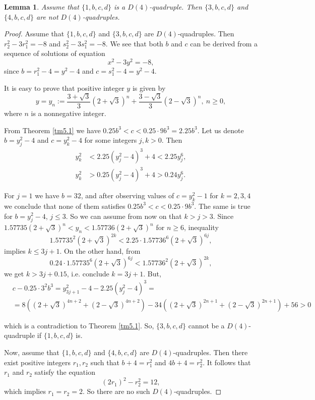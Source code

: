 \documentclass[12pt]{amsart}%
\newtheorem{lemma}[theorem]{Lemma}
\theoremstyle{definition}
\theoremstyle{remark}
\theoremstyle{plain}
\begin{document}
\begin{lemma}\label{lem:a1je1}
    Assume that $\{1,b,c,d\}$ is a $D(4)$-quadruple. Then $\{3,b,c,d\}$ and $\{4,b,c,d\}$ are not $D(4)$-quadruples.  
\end{lemma}
\begin{proof}
    Assume that $\{1,b,c,d\}$ and $\{3,b,c,d\}$ are $D(4)$-quadruples. Then $r_2^2-3r_1^2=-8$ and $s_2^2-3s_1^2=-8.$ We see that both $b$ and $c$ can be derived from a sequence of solutions of equation \begin{equation}\label{eq:pellova_r_13}
    x^2-3y^2=-8,
    \end{equation}
    since $b=r_1^2-4=y^2-4$ and $c=s_1^2-4=y^2-4$. 

    It is easy to prove that positive integer $y$ is given by
    $$
    y=y_n:=\frac{3+\sqrt{3}}{3}(2+\sqrt{3})^n+\frac{3-\sqrt{3}}{3}(2-\sqrt{3})^n,\ n\geq 0,
    $$
   where  $n$ is a nonnegative integer.

    From Theorem \ref{tm5.1} we have $0.25b^3<c<0.25\cdot 9b^3=2.25b^3$. Let us denote $b=y_j^2-4$ and $c=y_k^2-4$ for some integers $j,k>0$. Then 
    \begin{align*}
        y_k^2&<2.25(y_j^2-4)^3+4<2.25y_j^6,\\
        y_k^2&>0.25(y_j^2-4)^3+4>0.24y_j^6.
    \end{align*}

    For $j=1$ we have $b=32$, and after observing values of $c=y_k^2-1$ for $k=2,3,4$ we conclude that none of them satisfies $0.25b^3<c<0.25\cdot 9b^3$.  
     The same is true for $b=y_j^2-4$, $j\leq 3$. So we can assume from now on that $k>j>3$.  
    Since $1.57735(2+\sqrt{3})^n<y_n<1.57736(2+\sqrt{3})^n$ for $n\geq 6$, inequality
    $$1.57735^2(2+\sqrt{3})^{2k}<2.25\cdot 1.57736^6(2+\sqrt{3})^{6j},$$
     implies $k\leq 3j+1$. On the other hand, from 
    $$0.24\cdot 1.57735^6(2+\sqrt{3})^{6j}<1.57736^2(2+\sqrt{3})^{2k},$$
   we get $k>3j+0.15$, i.e. conclude $k=3j+1$.
    But, 
    \begin{align*}
&c-0.25\cdot3^2b^3=y_{3j+1}^2-4-2.25(y_j^2-4)^3=\\
&=8 ((2 + \sqrt{3})^{4 n + 2} + (2 - \sqrt{3})^{4 n + 2}) - 
 34 ((2 + \sqrt{3})^{2 n + 1} + (2 - \sqrt{3})^{2 n + 1}) + 56>0
    \end{align*}
  
    which is a contradiction to Theorem \ref{tm5.1}. So, $\{3,b,c,d\}$ cannot be a $D(4)$-quadruple if $\{1,b,c,d\}$ is.

    Now, assume that $\{1,b,c,d\}$ and $\{4,b,c,d\}$ are $D(4)$-quadruples. Then there exist positive integers $r_1,r_2$ such that 
    $b+4=r_1^2$ and $4b+4=r_2^2.$
   It follows that $r_1$ and $r_2$ satisfy the equation
 \begin{equation*}
 (2r_1)^2-r_2^2=12,
 \end{equation*}
 which implies $r_1=r_2=2$. So there are no such $D(4)$-quadruples.
\end{proof}
\end{document}
